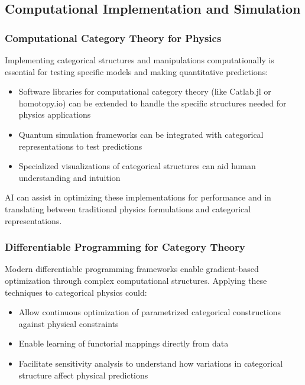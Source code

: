 \subsection{Computational Implementation and Simulation}

\subsubsection{Computational Category Theory for Physics}

Implementing categorical structures and manipulations computationally is essential for testing specific models and making quantitative predictions:

\begin{itemize}
    \item Software libraries for computational category theory (like Catlab.jl or homotopy.io) can be extended to handle the specific structures needed for physics applications
    \item Quantum simulation frameworks can be integrated with categorical representations to test predictions
    \item Specialized visualizations of categorical structures can aid human understanding and intuition
\end{itemize}

AI can assist in optimizing these implementations for performance and in translating between traditional physics formulations and categorical representations.

\subsubsection{Differentiable Programming for Category Theory}

Modern differentiable programming frameworks enable gradient-based optimization through complex computational structures. Applying these techniques to categorical physics could:

\begin{itemize}
    \item Allow continuous optimization of parametrized categorical constructions against physical constraints
    \item Enable learning of functorial mappings directly from data
    \item Facilitate sensitivity analysis to understand how variations in categorical structure affect physical predictions
\end{itemize}

